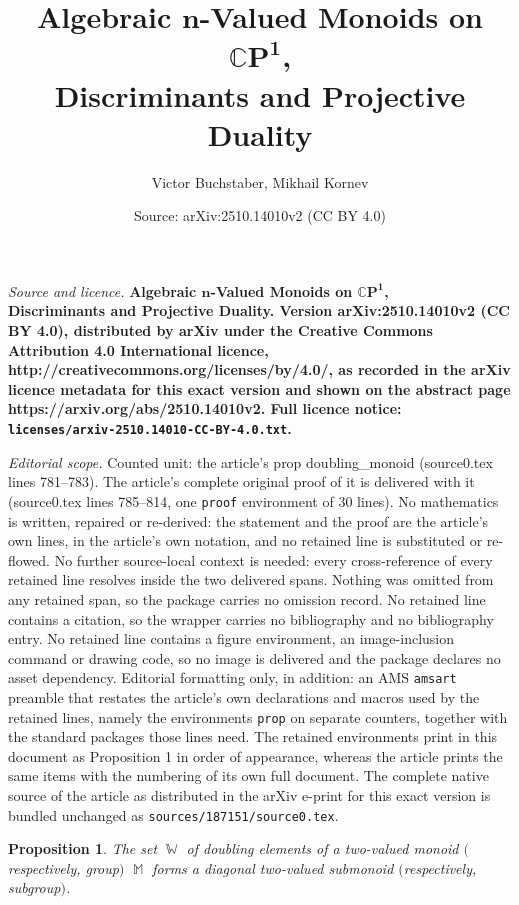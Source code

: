 \documentclass[10pt,a4paper]{amsart}
\title{\bf Algebraic $\bm{n}$-Valued Monoids on $\bm{\mathbb{C}P^1}$,\\ Discriminants and Projective Duality}
\author{Victor Buchstaber, Mikhail Kornev}
\date{Source: arXiv:2510.14010v2 (CC BY 4.0)}
\newtheorem{prop}{Proposition}
\DeclareMathOperator{\M}{\mathbb{M}}
\DeclareMathOperator{\W}{\mathbb{W}}
\begin{document}
\maketitle

\noindent\emph{Source and licence.} \bf Algebraic $\bm{n}$-Valued Monoids on $\bm{\mathbb{C}P^1}$,\\ Discriminants and Projective Duality. Version arXiv:2510.14010v2 (CC BY 4.0), distributed by arXiv under the Creative Commons Attribution 4.0 International licence, http://creativecommons.org/licenses/by/4.0/, as recorded in the arXiv licence metadata for this exact version and shown on the abstract page https://arxiv.org/abs/2510.14010v2. Full licence notice: \texttt{licenses/arxiv-2510.14010-CC-BY-4.0.txt}.\par\smallskip

\noindent\textit{Editorial scope.} Counted unit: the article's prop doubling\_monoid (source0.tex lines 781--783). The article's complete original proof of it is delivered with it (source0.tex lines 785--814, one \texttt{proof} environment of 30 lines). No mathematics is written, repaired or re-derived: the statement and the proof are the article's own lines, in the article's own notation, and no retained line is substituted or re-flowed.  No further source-local context is needed: every cross-reference of every retained line resolves inside the two delivered spans.  Nothing was omitted from any retained span, so the package carries no omission record.  No retained line contains a citation, so the wrapper carries no bibliography and no bibliography entry.  No retained line contains a figure environment, an image-inclusion command or drawing code, so no image is delivered and the package declares no asset dependency.  Editorial formatting only, in addition: an AMS \texttt{amsart} preamble that restates the article's own declarations and macros used by the retained lines, namely the environments \texttt{prop} on separate counters, together with the standard packages those lines need.  The retained environments print in this document as Proposition 1 in order of appearance, whereas the article prints the same items with the numbering of its own full document.  The complete native source of the article as distributed in the arXiv e-print for this exact version is bundled unchanged as \texttt{sources/187151/source0.tex}.
\begin{prop}\label{doubling_monoid}
The set $\W$ of doubling elements of a two-valued monoid $($respectively, group$)$ $\M$ forms a diagonal two-valued submonoid $($respectively, subgroup$)$.
\end{prop}
\end{document}
